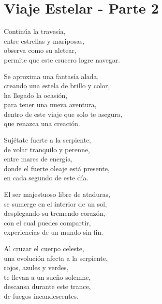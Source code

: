 \section*{Viaje Estelar - Parte 2}
\label{Viaje_estelar_p2}

\vspace{1em}
\begin{center}
Continúa la travesía,\\
entre estrellas y mariposas,\\
observa como su aletear,\\
permite que este crucero logre navegar.

\vspace{1em}
Se aproxima una fantasía alada,\\
creando una estela de brillo y color,\\
ha llegado la ocasión,\\
para tener una nueva aventura,\\
dentro de este viaje que solo te asegura,\\
que renazca una creación.

\vspace{1em}
Sujétate fuerte a la serpiente,\\
de volar tranquilo y perenne,\\
entre mares de energía,\\
donde el fuerte oleaje está presente,\\
en cada segundo de este día.

\vspace{1em}
El ser majestuoso libre de ataduras,\\
se sumerge en el interior de un sol,\\
desplegando su tremendo corazón,\\
con el cual puedes compartir,\\
experiencias de un mundo sin fin.

\vspace{1em}
Al cruzar el cuerpo celeste,\\
una evolución afecta a la serpiente,\\
rojos, azules y verdes,\\
te llevan a un sueño solemne,\\
descansa durante este trance,\\
de fuegos incandescentes.


\end{center}
